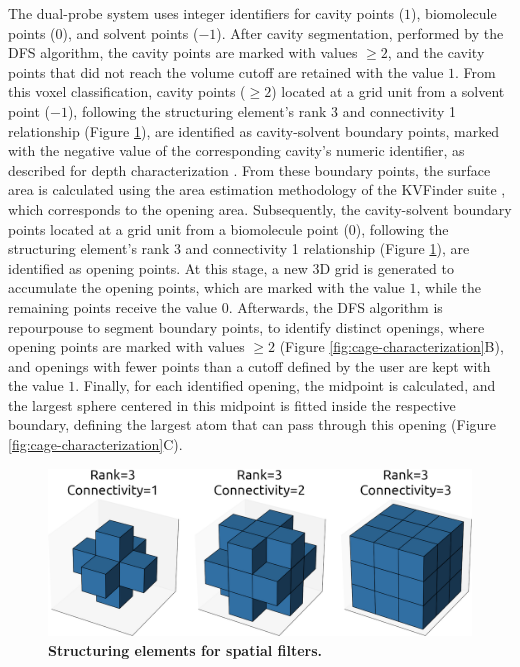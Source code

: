 \documentclass[Ingles]{phdthesis}
\begin{document}
The dual-probe system uses integer identifiers for cavity points ($1$), biomolecule points ($0$), and solvent points ($-1$). After cavity segmentation, performed by the \ac{DFS} algorithm, the cavity points are marked with values $\geq2$, and the cavity points that did not reach the volume cutoff are retained with the value $1$. From this voxel classification, cavity points ($\geq2$) located at a grid unit from a solvent point ($-1$), following the structuring element's rank 3 and connectivity 1 relationship (Figure \ref{fig:structuring-elements}), are identified as cavity-solvent boundary points, marked with the negative value of the corresponding cavity's numeric identifier, as described for depth characterization \cite{guerra2019,guerra2021}. From these boundary points, the surface area is calculated using the area estimation methodology of the KVFinder suite \cite{guerra2019,guerra2020}, which corresponds to the opening area. Subsequently, the cavity-solvent boundary points located at a grid unit from a biomolecule point ($0$), following the structuring element's rank 3 and connectivity 1 relationship (Figure \ref{fig:structuring-elements}), are identified as opening points. At this stage, a new \acs{3D} grid is generated to accumulate the opening points, which are marked with the value $1$, while the remaining points receive the value $0$. Afterwards, the \acs{DFS} algorithm is repourpouse to segment boundary points, to identify distinct openings, where opening points are marked with values $\geq2$ (Figure \ref{fig:cage-characterization}B), and openings with fewer points than a cutoff defined by the user are kept with the value $1$. Finally, for each identified opening, the midpoint is calculated, and the largest sphere centered in this midpoint is fitted inside the respective boundary, defining the largest atom that can pass through this opening (Figure \ref{fig:cage-characterization}C).

\begin{figure}[h]
  \centering
  \includegraphics[scale=1]{images/3D-binary-structure.png}
  \caption[Structuring elements for spatial filters]{\textbf{Structuring elements for spatial filters.}}
  \label{fig:structuring-elements}
\end{figure}
\end{document}
